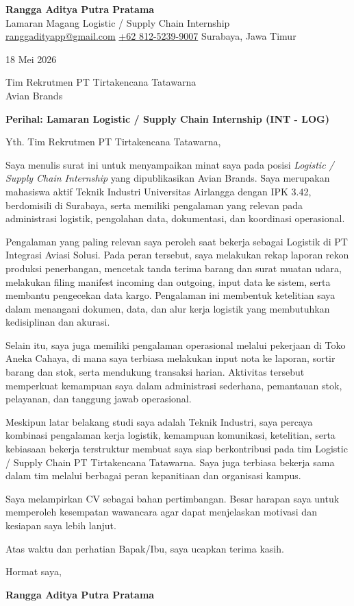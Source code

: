 \documentclass[a4paper,11pt]{article}
\begin{document}
{\LARGE\bfseries Rangga Aditya Putra Pratama}\\
{\color{accent}Lamaran Magang Logistic / Supply Chain Internship}\\
\href{mailto:ranggadityapp@gmail.com}{ranggadityapp@gmail.com} \quad\textbar\quad
\href{tel:+6281252399007}{+62 812-5239-9007} \quad\textbar\quad
Surabaya, Jawa Timur

\vspace{12pt}

18 Mei 2026

\vspace{12pt}

Tim Rekrutmen PT Tirtakencana Tatawarna\\
Avian Brands

\vspace{12pt}

\textbf{Perihal: Lamaran Logistic / Supply Chain Internship (INT - LOG)}

\vspace{12pt}

Yth. Tim Rekrutmen PT Tirtakencana Tatawarna,

Saya menulis surat ini untuk menyampaikan minat saya pada posisi \textit{Logistic / Supply Chain Internship} yang dipublikasikan Avian Brands. Saya merupakan mahasiswa aktif Teknik Industri Universitas Airlangga dengan IPK 3.42, berdomisili di Surabaya, serta memiliki pengalaman yang relevan pada administrasi logistik, pengolahan data, dokumentasi, dan koordinasi operasional.

Pengalaman yang paling relevan saya peroleh saat bekerja sebagai Logistik di PT Integrasi Aviasi Solusi. Pada peran tersebut, saya melakukan rekap laporan rekon produksi penerbangan, mencetak tanda terima barang dan surat muatan udara, melakukan filing manifest incoming dan outgoing, input data ke sistem, serta membantu pengecekan data kargo. Pengalaman ini membentuk ketelitian saya dalam menangani dokumen, data, dan alur kerja logistik yang membutuhkan kedisiplinan dan akurasi.

Selain itu, saya juga memiliki pengalaman operasional melalui pekerjaan di Toko Aneka Cahaya, di mana saya terbiasa melakukan input nota ke laporan, sortir barang dan stok, serta mendukung transaksi harian. Aktivitas tersebut memperkuat kemampuan saya dalam administrasi sederhana, pemantauan stok, pelayanan, dan tanggung jawab operasional.

Meskipun latar belakang studi saya adalah Teknik Industri, saya percaya kombinasi pengalaman kerja logistik, kemampuan komunikasi, ketelitian, serta kebiasaan bekerja terstruktur membuat saya siap berkontribusi pada tim Logistic / Supply Chain PT Tirtakencana Tatawarna. Saya juga terbiasa bekerja sama dalam tim melalui berbagai peran kepanitiaan dan organisasi kampus.

Saya melampirkan CV sebagai bahan pertimbangan. Besar harapan saya untuk memperoleh kesempatan wawancara agar dapat menjelaskan motivasi dan kesiapan saya lebih lanjut.

Atas waktu dan perhatian Bapak/Ibu, saya ucapkan terima kasih.

Hormat saya,

\vspace{12pt}

\textbf{Rangga Aditya Putra Pratama}
\end{document}
